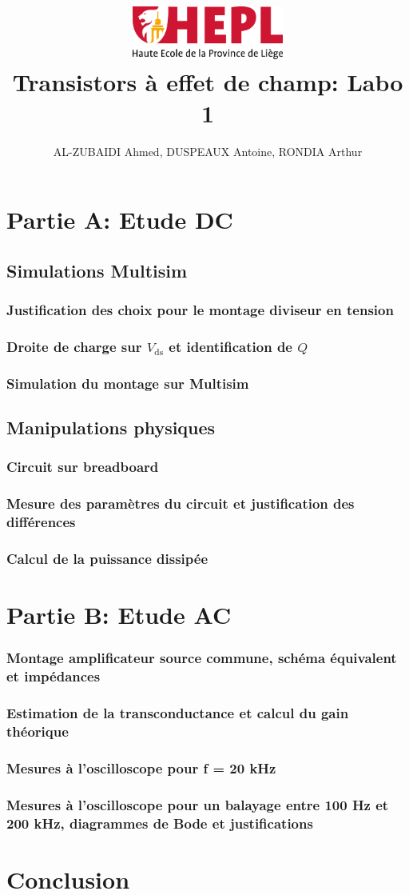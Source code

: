 \documentclass[french,10pt,a4paper]{article}
\title{\centering\includegraphics[width=5cm]{images/hepl_logo.png}\\Transistors à effet de champ: Labo 1}
\author{AL-ZUBAIDI Ahmed, DUSPEAUX Antoine, RONDIA Arthur}
\begin{document}
	\maketitle
	\section{Partie A: Etude DC}
		\subsection{Simulations Multisim}
			\subsubsection{Justification des choix pour le montage diviseur en tension}
			\subsubsection{Droite de charge sur $V_\text{ds}$ et identification de $Q$}
			\subsubsection{Simulation du montage sur Multisim}
		\subsection{Manipulations physiques}
			\subsubsection{Circuit sur breadboard}
			\subsubsection{Mesure des paramètres du circuit et justification des différences}
			\subsubsection{Calcul de la puissance dissipée}
		
	
	\section{Partie B: Etude AC}
			\subsubsection{Montage amplificateur source commune, schéma équivalent et impédances}
			\subsubsection{Estimation de la transconductance et calcul du gain théorique}
			\subsubsection{Mesures à l'oscilloscope pour f = 20 kHz}
			\subsubsection{Mesures à l'oscilloscope pour un balayage entre 100 Hz et 200 kHz, diagrammes de Bode et justifications}

		
	\section{Conclusion}
		
\end{document}
